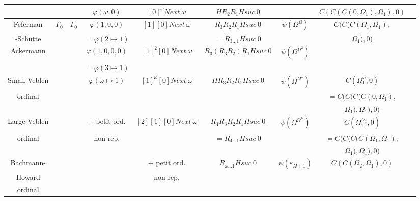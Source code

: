 \documentclass[8pt]{article}
\begin{document}
\begin{tabular}{|c|c|c|c|c|c|c|c|c|}
		&			&			& \(\varphi(\omega,0)\)		& \([0]^\omega Next\ \omega\) & \(H R_2 R_1 H suc\ 0\)&					& \(C(C(C(0,\Omega_1),\Omega_1),0)\) \\ \hline
Feferman	& \(\Gamma_0\)		
								& \(\Gamma_0\)			& \(\varphi(1,0,0)\)		& \([1] [0] Next\ \omega\)	& \(R_3 R_2 R_1 H suc\ 0\) & \(\psi(\Omega^\Omega)\)		& \(C(C(C(\Omega_1,\Omega_1),\) \\ 
-Schütte	&			&				& \(=\varphi(2 \mapsto 1)\)	&				& \(= R_{3 \ldots 1} H suc\ 0\) & 					& \(\Omega_1),0)\)		\\ \hline
Ackermann	&			&				& \(\varphi(1,0,0,0)\)		& \([1]^2 [0] Next\ \omega\) & \(R_3 (R_3 R_2) R_1 H suc\ 0\) & \(\psi(\Omega^{\Omega^2})\)		&				\\ 
		&			&				& \(=\varphi(3 \mapsto 1)\)	&				&			&					&				\\ \hline
Small Veblen	&			&				& \(\varphi(\omega \mapsto 1)\)	& \([1]^\omega [0] Next\ \omega\) & \(H R_3 R_2 R_1 H suc\ 0\) & \(\psi(\Omega^{\Omega^\omega})\)	& \(C(\Omega_1^\omega,0)\)	\\
ordinal		&			&				&				&				&			&					& \(=C(C(C(C(0,\Omega_1), \)	\\ 
		&			&				&				&				&			&					& \(\Omega_1),\Omega_1),0)\)	\\ \hline
Large Veblen	&			&				& + petit ord.	 	 	& \([2] [1] [0] Next\ \omega\)	& \(R_4 R_3 R_2 R_1 H suc\ 0\) & \(\psi(\Omega^{\Omega^\Omega})\)	& \(C(\Omega_1^{\Omega_1},0)\)	\\
ordinal		&			&				& non rep.			&				& \(= R_{4 \ldots 1} H suc\ 0\) &					& \(=C(C(C(C(\Omega_1,\Omega_1),\) \\ 
		&			&				&				&				&			&					& \( \Omega_1),\Omega_1),0) \)	\\ \hline
Bachmann-	&			&				&				& + petit ord.			& \(R_{\omega \ldots 1} H suc\ 0\) & \(\psi(\varepsilon_{\Omega+1})\)	& \(C(C(\Omega_2,\Omega_1),0)\)	\\
Howard		&			&				&				& non rep.			&			&					&				\\ 
ordinal		&			&				&				&				&			&					&				\\ \hline
  
\end{tabular}
\end{document}
